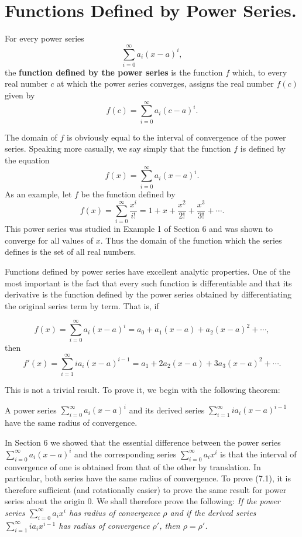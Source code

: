 \section{Functions Defined by Power Series.} For every power series
$$
\sum_{i=0}^\infty a_i(x - a)^i,
$$
\noindent the \textbf{function defined by the power series} is the function $f$ which, to every real number $c$ at which the power series converges, assigns the real number $f(c)$ given by
$$
f(c) = \sum_{i=0}^\infty a_i(c - a)^i.
$$

\noindent The domain of $f$ is obviously equal to the interval of convergence of the power series. Speaking more casually, we say simply that the function $f$ is defined by the equation
$$
f(x) = \sum_{i=0}^\infty  a_i(x - a)^i.  
$$
\noindent As an example, let $f$ be the function defined by
$$
f(x) = \sum_{i=0}^\infty \frac{x^i}{ i!} = 1 + x + \frac{x^2}{2!} + \frac{x^3}{3!} + \cdots .
$$
\noindent This power series was studied in Example 1 of Section 6 and was shown to converge for all values of $x$. Thus the domain of the function which the series defines is the set of all real numbers.

Functions defined by power series have excellent analytic properties. One of the most important is the fact that every such function is differentiable and that its derivative is the function defined by the power series obtained by differentiating the original series term by term. That
is, if

$$
f(x) =  \sum_{i=0}^\infty a_{i}(x-a)^i = a_0 + a_{1}(x-a) + a_{2}(x-a)^2 + \cdots , 
$$
\noindent then
$$
f'(x) = \sum_{i=1}^\infty i a_{i} (x-a)^{i-1} = a_{1} + 2a_{2}(x-a) + 3a_{3}(x-a)^2 + \cdots .
$$

\noindent This is not a trivial result. To prove it, we begin with the following theorem:

\begin{theorem} A power series $\sum_{i=0}^\infty a_{i}(x-a)^i$ and its derived series $\sum_{i=1}^\infty ia_{i} (x-a)^{i-1}$ have the same radius of convergence.
\end{theorem}

In Section 6 we showed that the essential difference between the power series $\sum_{i=0}^\infty a_{i}(x-a)^i$ and the corresponding series $\sum_{i=0}^\infty a_{i}x^i$ is that the interval of convergence of one is obtained from that of the other by translation. In particular, both series have the same radius of convergence. To prove (7.1), it is therefore sufficient (and rotationally easier) to prove the same result for power series about the origin 0. We shall therefore prove the following: \textit{If the power series $\sum_{i=0}^\infty a_{i}x^i$ has radius of convergence $\rho$ and if the derived series $\sum_{i=1}^\infty ia_{i}x^{i-1}$ has radius of convergence $\rho'$, then $\rho = \rho'$.}

